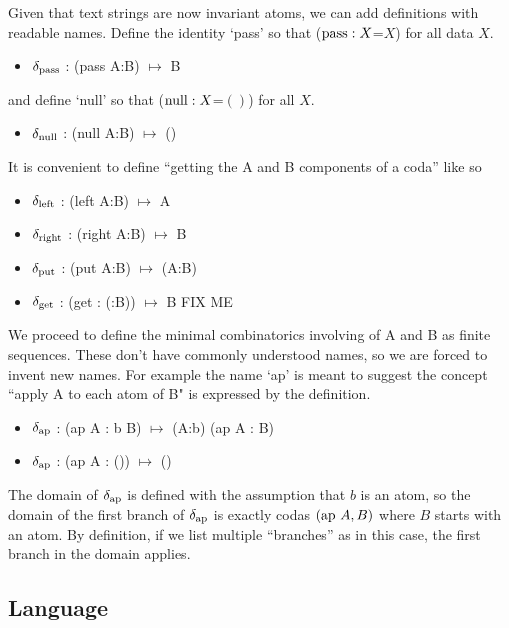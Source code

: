 \documentclass[11pt]{article}
\begin{document}
Given that text strings are now invariant atoms, we can add definitions with readable names.  Define the identity `pass' so that (${\rm pass}:X$=$X$) for all data $X$.  
\begin{itemize}
\item{$\delta_{\rm pass}$ : ({\rm pass} A:B) $\mapsto$ B}
\end{itemize}
and define `null' so that (${\rm null}:X$=$()$) for all $X$.
\begin{itemize}
\item{$\delta_{\rm null}$ : ({\rm null} A:B) $\mapsto$ ()}
\end{itemize}
It is convenient to define ``getting the A and B components of a coda'' like so
\begin{itemize}
\item{$\delta_{\rm left}$ : ({\rm left} A:B) $\mapsto$ A} 
\item{$\delta_{\rm right}$ : ({\rm right} A:B) $\mapsto$ B} 
\item{$\delta_{\rm put}$ : ({\rm put} A:B) $\mapsto$ (A:B)}
\item{$\delta_{\rm get}$ : ({\rm get} : (:B)) $\mapsto$ B} FIX ME
\end{itemize}
We proceed to define the minimal combinatorics involving of A and B as finite sequences.  These don't have 
commonly understood names, so we are forced to invent new names.  For example the name `ap' is meant to suggest the 
concept ``apply A to each atom of B" is expressed by the definition.  
\begin{itemize}
\item{$\delta_{\rm ap}$ : ({\rm ap} A : b B) $\mapsto$ (A:b) ({\rm ap} A : B)}
\item{$\delta_{\rm ap}$ : ({\rm ap} A : ()) $\mapsto$ ()} 
\end{itemize} 
The domain of $\delta_{\rm ap}$ is defined with the assumption that $b$ is an atom, so the domain of the first branch of $\delta_{\rm ap}$ is exactly 
codas $({\rm ap}\ A,B)$ where $B$ starts with an atom.  By definition, if we list multiple ``branches'' as in this case, the first branch in the domain applies.  

\subsection{Language} 
\end{document}
